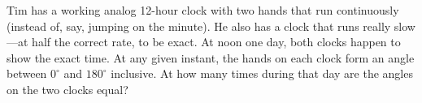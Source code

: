 Tim has a working analog 12-hour clock with two hands that run continuously (instead of, say, jumping on the minute). He also has a clock that runs really slow—at half the correct rate, to be exact. At noon one day, both clocks happen to show the exact time. At any given instant, the hands on each clock form an angle between $0^\circ$ and $180^\circ$ inclusive. At how many times during that day are the angles on the two clocks equal?